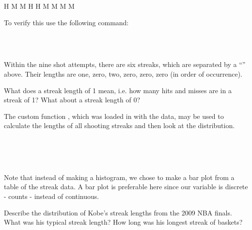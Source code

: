 \documentclass[11pt]{article}
\begin{document}
\begin{center}
 H  \quad M \quad \textbar \quad M \quad \textbar \quad H \quad  H \quad M \quad \textbar \quad M \quad \textbar \quad M \quad \textbar \quad M
\end{center}

To verify this use the following command:

\ttfamily\noindent
\hlstd{}\hspace*{\fill}\\
\hlstd{}\hlkeyword{\usebox{\hlnormalsizeboxdollar}}\hlkeyword{[}\hlkeyword{:}\hlkeyword{]}\hspace*{\fill}\\
\normalfont

Within the nine shot attempts, there are six streaks, which are separated by a ``\textbar'' above. Their lengths are one, zero, two, zero, zero, zero (in order of occurrence).

\begin{exercise}
What does a streak length of 1 mean, i.e. how many hits and misses are in a streak of 1? What about a streak length of 0?
\end{exercise}

The custom function \texttt{}, which was loaded in with the data, may be used to calculate the lengths of all shooting streaks and then look at the distribution.

\ttfamily\noindent
\hlstd{}\hspace*{\fill}\\
\hlstd{}\hlassignement{\usebox{\hlnormalsizeboxlessthan}-}{\ }\hlkeyword{(}\hlkeyword{\usebox{\hlnormalsizeboxdollar}}\hlkeyword{)}\hspace*{\fill}\\
\hlstd{}\hlkeyword{(}\hlkeyword{(}\hlkeyword{)}\hlkeyword{)}\hspace*{\fill}\\
\normalfont

Note that instead of making a histogram, we chose to make a bar plot from a table of the streak data.  A bar plot is preferable here since our variable is discrete - counts - instead of continuous.

\begin{exercise}
\label{kobeStreak}
Describe the distribution of Kobe's streak lengths from the 2009 NBA finals.  What was his typical streak length?  How long was his longest streak of baskets?
\end{exercise}
\end{document}
